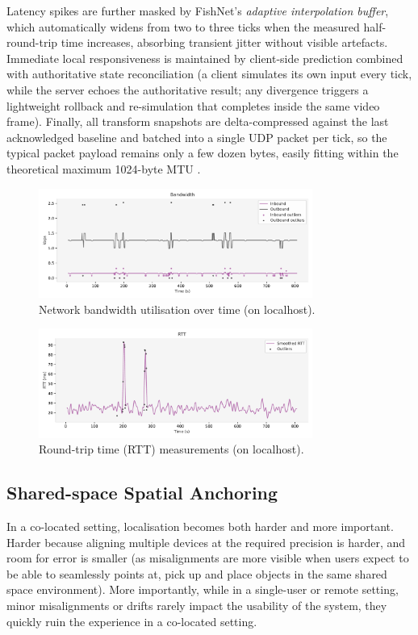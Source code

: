 Latency spikes are further masked by FishNet's \emph{adaptive interpolation buffer}, which automatically widens from two to three ticks when the measured half-round-trip time increases, absorbing transient jitter without visible artefacts. Immediate local responsiveness is maintained by client-side prediction combined with authoritative state reconciliation (a client simulates its own input every tick, while the server echoes the authoritative result; any divergence triggers a lightweight rollback and re-simulation that completes inside the same video frame). Finally, all transform snapshots are delta-compressed against the last acknowledged baseline and batched into a single UDP packet per tick, so the typical packet payload remains only a few dozen bytes, easily fitting within the theoretical maximum 1024-byte MTU \cite{fishnetDocs2024, dobson2024lagcomp}.

\begin{figure}[t!]
  \centering
  \includegraphics[width=0.8\textwidth]{assets/04/bandwidth.pdf}
  \caption{Network bandwidth utilisation over time (on localhost).}
  \label{fig:bandwidth}
\end{figure}

\begin{figure}[t!]
  \centering
  \includegraphics[width=0.8\textwidth]{assets/04/rtt.pdf}
  \caption{Round-trip time (RTT) measurements (on localhost).}
  \label{fig:rtt}
\end{figure}


\subsection{Shared-space Spatial Anchoring}\label{subsec:anchoring}
In a co-located setting, localisation becomes both harder and more important. Harder because aligning multiple devices at the required precision is harder, and room for error is smaller (as misalignments are more visible when users expect to be able to seamlessly points at, pick up and place objects in the same shared space environment). More importantly, while in a single-user or remote setting, minor misalignments or drifts rarely impact the usability of the system, they quickly ruin the experience in a co-located setting.

